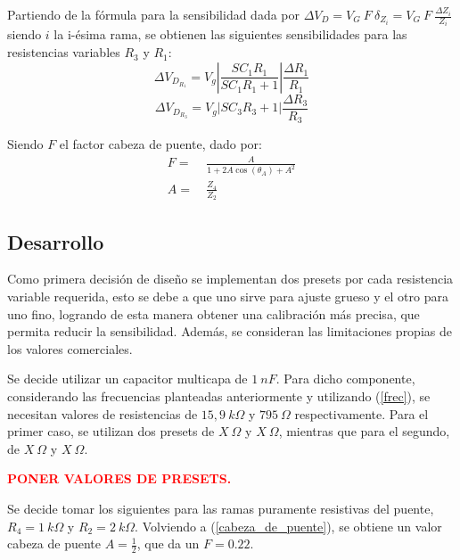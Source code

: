 Partiendo de la fórmula para la sensibilidad dada por $\Delta V_D=V_G \ F \ \delta_{Z_i}=V_G \ F \ \frac{\Delta Z_i}{Z_i}$ siendo $i$ la i-ésima rama, se obtienen las siguientes sensibilidades para las resistencias variables $R_3$ y $R_1$:
\begin{equation}
\Delta V_{D_{R_1}}=V_g\left|\frac{SC_1R_1}{SC_1R_1+1}\right|\frac{\Delta R_1}{R_1}
\end{equation}
\begin{equation}
\Delta V_{D_{R_3}}=V_g\left|SC_3R_3+1\right|\frac{\Delta R_3}{R_3}
\end{equation}

Siendo $F$ el factor cabeza de puente, dado por:
\begin{equation}
\begin{split}
F=& \ \frac{A}{1+2A\cos(\theta_A)+A^2} \\
A=& \ \frac{Z_4}{Z_2}
\end{split}
\label{cabeza_de_puente}
\end{equation} 

\subsection{Desarrollo}

Como primera decisión de diseño se implementan dos presets por cada resistencia variable requerida, esto se debe a que uno sirve para ajuste grueso y el otro para uno fino, logrando de esta manera obtener una calibración más precisa, que permita reducir la sensibilidad. Además, se consideran las limitaciones propias de los valores comerciales.

Se decide utilizar un capacitor multicapa de $1 \ nF$. Para dicho componente, considerando las frecuencias planteadas anteriormente y utilizando (\ref{frec}), se necesitan valores de resistencias de $15,9 \ k\Omega$ y $795 \ \Omega$ respectivamente. Para el primer caso, se utilizan dos presets de $X \ \Omega$ y $X \ \Omega$, mientras que para el segundo, de $X \ \Omega$ y $X \ \Omega$.
\begin{center}
	\huge{\textcolor{red}{\textbf{PONER VALORES DE PRESETS.}}}
\end{center}

Se decide tomar los siguientes para las ramas puramente resistivas del puente, $R_4= 1 \ k\Omega$ y $R_2= 2 \ k\Omega$. Volviendo a (\ref{cabeza_de_puente}), se obtiene un valor cabeza de puente $A=\frac{1}{2}$, que da un $F=0.22$.

